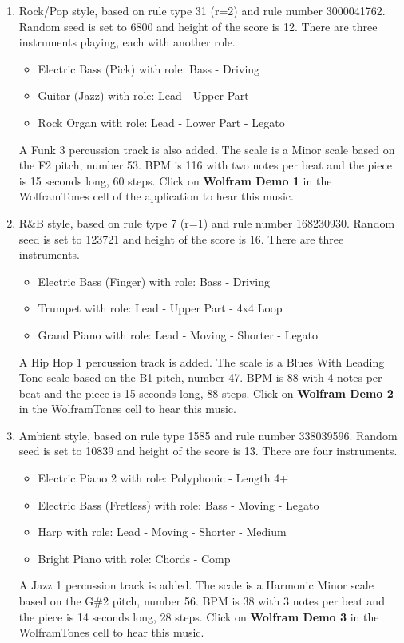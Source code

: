 \documentclass[12pt]{article}
\begin{document}
\begin{enumerate}
\item Rock/Pop style, based on rule type 31 (r=2) and rule number 3000041762. Random seed is set to 6800 and height of the score is 12. There are three instruments playing, each with another role.
\begin{itemize}
\item Electric Bass (Pick) with role: Bass - Driving
\item Guitar (Jazz) with role: Lead - Upper Part
\item Rock Organ with role: Lead - Lower Part - Legato 
\end{itemize}
A Funk 3 percussion track is also added. The scale is a Minor scale based on the F2 pitch, number 53. BPM is 116 with two notes per beat and the piece is 15 seconds long, 60 steps. Click on \textbf{Wolfram Demo 1} in the WolframTones cell of the application to hear this music.

\item R\&B style, based on rule type 7 (r=1) and rule number 168230930. Random seed is set to 123721 and height of the score is 16.
There are three instruments.
\begin{itemize}
\item Electric Bass (Finger) with role: Bass - Driving
\item Trumpet with role: Lead - Upper Part - 4x4 Loop
\item Grand Piano with role: Lead - Moving - Shorter - Legato 
\end{itemize}
A Hip Hop 1 percussion track is added. The scale is a Blues With Leading Tone scale based on the B1 pitch, number 47. BPM is 88 with 4 notes per beat and the piece is 15 seconds long, 88 steps. Click on \textbf{Wolfram Demo 2} in the WolframTones cell to hear this music.

\item Ambient style, based on rule type 1585 and rule number 338039596. Random seed is set to 10839 and height of the score is 13.
There are four instruments.
\begin{itemize}
\item Electric Piano 2 with role: Polyphonic - Length 4+
\item Electric Bass (Fretless) with role: Bass - Moving - Legato
\item Harp with role: Lead - Moving - Shorter - Medium
\item Bright Piano with role: Chords - Comp
\end{itemize}
A Jazz 1 percussion track is added. The scale is a Harmonic Minor scale based on the G\#2 pitch, number 56. BPM is 38 with 3 notes per beat and the piece is 14 seconds long, 28 steps. Click on \textbf{Wolfram Demo 3} in the WolframTones cell to hear this music.
\end{enumerate}
\end{document}
